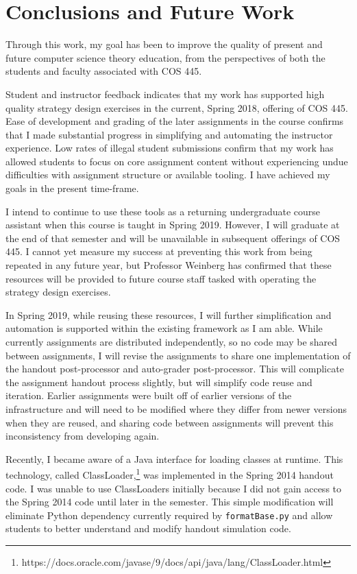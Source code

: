 \documentclass[pageno]{jpaper}
\begin{document}
\section*{Conclusions and Future Work}
Through this work, my goal has been to improve the quality of present and future computer science theory education, from the perspectives of both the students and faculty associated with COS 445.

Student and instructor feedback indicates that my work has supported high quality strategy design exercises in the current, Spring 2018, offering of COS 445.
Ease of development and grading of the later assignments in the course confirms that I made substantial progress in simplifying and automating the instructor experience.
Low rates of illegal student submissions confirm that my work has allowed students to focus on core assignment content without experiencing undue difficulties with assignment structure or available tooling.
I have achieved my goals in the present time-frame.

I intend to continue to use these tools as a returning undergraduate course assistant when this course is taught in Spring 2019.
However, I will graduate at the end of that semester and will be unavailable in subsequent offerings of COS 445.
I cannot yet measure my success at preventing this work from being repeated in any future year, but Professor Weinberg has confirmed that these resources will be provided to future course staff tasked with operating the strategy design exercises.

In Spring 2019, while reusing these resources, I will further simplification and automation is supported within the existing framework as I am able.
While currently assignments are distributed independently, so no code may be shared between assignments, I will revise the assignments to share one implementation of the handout post-processor and auto-grader post-processor.
This will complicate the assignment handout process slightly, but will simplify code reuse and iteration.
Earlier assignments were built off of earlier versions of the infrastructure and will need to be modified where they differ from newer versions when they are reused, and sharing code between assignments will prevent this inconsistency from developing again.

Recently, I became aware of a Java interface for loading classes at runtime.
This technology, called ClassLoader,\footnote{https://docs.oracle.com/javase/9/docs/api/java/lang/ClassLoader.html} was implemented in the Spring 2014 handout code.
I was unable to use ClassLoaders initially because I did not gain access to the Spring 2014 code until later in the semester.
This simple modification will eliminate Python dependency currently required by \texttt{formatBase.py} and allow students to better understand and modify handout simulation code.
\end{document}
